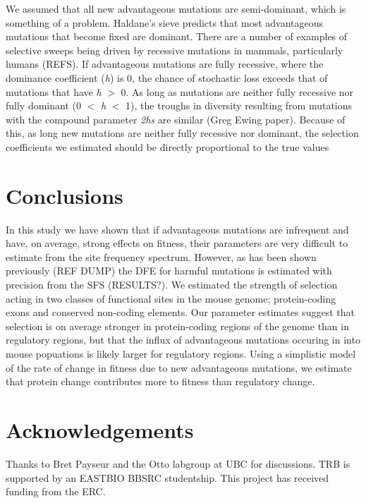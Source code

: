 \documentclass[11pt]{article}
\begin{document}


We assumed that all new advantageous mutations are semi-dominant, which is something of a problem. Haldane's sieve predicts that most advantageous mutations that become fixed are dominant. There are a number of examples of selective sweeps being driven by recessive mutations in mammals, particularly humans (REFS). If advantageous mutations are fully recessive, where the dominance coefficient (\textit{h}) is 0, the chance of stochastic loss exceeds that of mutations that have \textit{h} $>$ 0. As long as mutations are neither fully recessive nor fully dominant (0 $<$ \textit{h} $<$ 1), the troughs in diversity resulting from mutations with the compound parameter \textit{2hs} are similar (Greg Ewing paper). Because of this, as long new mutations are neither fully recessive nor dominant, the selection coefficients we estimated should be directly proportional to the true values


\section*{Conclusions}

In this study we have shown that if advantageous mutations are infrequent and have, on average, strong effects on fitness, their parameters are very difficult to estimate from the site frequency spectrum. However, as has been shown previously (REF DUMP) the DFE for harmful mutations is estimated with precision from the SFS (RESULTS?). We estimated the strength of selection acting in two classes of functional sites in the mouse genome; protein-coding exons and conserved non-coding elements. Our parameter estimates suggest that selection is on average stronger in protein-coding regions of the genome than in regulatory regions, but that the influx of advantageous mutations occuring in into mouse popuations is likely larger for regulatory regions. Using a simplistic model of the rate of change in fitness due to new advantageous mutations, we estimate that protein change contributes more to fitness than regulatory change.

\section*{Acknowledgements}

Thanks to Bret Payseur and the Otto labgroup at UBC for discussions. TRB is supported by an EASTBIO BBSRC studentship. This project has received funding from the ERC.
\end{document}

